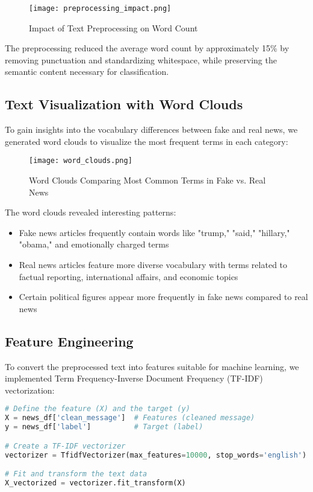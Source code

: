 \documentclass[12pt]{article}
\begin{document}
\begin{figure}[h]
    \centering
    \texttt{[image: preprocessing\_impact.png]}
    \caption{Impact of Text Preprocessing on Word Count}
\end{figure}

The preprocessing reduced the average word count by approximately 15\% by removing punctuation and standardizing whitespace, while preserving the semantic content necessary for classification.

\subsection{Text Visualization with Word Clouds}
To gain insights into the vocabulary differences between fake and real news, we generated word clouds to visualize the most frequent terms in each category:

\begin{figure}[h]
    \centering
    \texttt{[image: word\_clouds.png]}
    \caption{Word Clouds Comparing Most Common Terms in Fake vs. Real News}
\end{figure}

The word clouds revealed interesting patterns:
\begin{itemize}
    \item Fake news articles frequently contain words like "trump," "said," "hillary," "obama," and emotionally charged terms
    \item Real news articles feature more diverse vocabulary with terms related to factual reporting, international affairs, and economic topics
    \item Certain political figures appear more frequently in fake news compared to real news
\end{itemize}

\subsection{Feature Engineering}
To convert the preprocessed text into features suitable for machine learning, we implemented Term Frequency-Inverse Document Frequency (TF-IDF) vectorization:

\begin{lstlisting}[language=Python, caption=TF-IDF Vectorization Implementation]
# Define the feature (X) and the target (y)
X = news_df['clean_message']  # Features (cleaned message)
y = news_df['label']          # Target (label)

# Create a TF-IDF vectorizer
vectorizer = TfidfVectorizer(max_features=10000, stop_words='english')

# Fit and transform the text data
X_vectorized = vectorizer.fit_transform(X)
\end{lstlisting}
\end{document}
